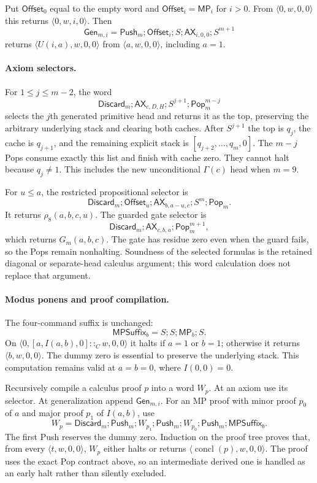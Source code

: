 Put $\mathsf{Offset}_0$ equal to the empty word and
$\mathsf{Offset}_i=\mathsf{MP}_i$ for $i>0$. From
$\langle0,w,0,0\rangle$ this returns $\langle0,w,i,0\rangle$.
Then
\[
 \mathsf{Gen}_{m,i}=\mathsf{Push}_m;\mathsf{Offset}_i;S;
                    \mathsf{AX}_{i,0,0};S^{m+1}
\]
returns $\langle U(i,a),w,0,0\rangle$ from
$\langle a,w,0,0\rangle$, including $a=1$.

\paragraph{Axiom selectors.}
For $1\le j\le m-2$, the word
\[
 \mathsf{Discard}_m;\mathsf{AX}_{c,D,H};S^{j+1};
      \mathsf{Pop}_m^{m-j}
\]
selects the $j$th generated primitive head and returns it as the top,
preserving the arbitrary underlying stack and clearing both caches.
After $S^{j+1}$ the top is $q_j$, the cache is $q_{j+1}$, and the remaining
explicit stack is $[q_{j+2},\ldots,q_m,0]$. The $m-j$ Pops consume exactly
this list and finish with cache zero. They cannot halt because $q_j\ne1$.
This includes the new unconditional $\Gamma(c)$ head when $m=9$.

For $u\le a$, the restricted propositional selector is
\[
 \mathsf{Discard}_m;\mathsf{Offset}_u;
 \mathsf{AX}_{b,a-u,c};S^m;\mathsf{Pop}_m.
\]
It returns $\rho_8(a,b,c,u)$. The guarded gate selector is
\[
 \mathsf{Discard}_m;\mathsf{AX}_{c,b,a};\mathsf{Pop}_m^{m+1},
\]
which returns $G_m(a,b,c)$. The gate has residue zero even when the guard
fails, so the Pops remain nonhalting. Soundness of the selected formulas
is the retained diagonal or separate-head calculus argument; this word
calculation does not replace that argument.

\paragraph{Modus ponens and proof compilation.}
The four-command suffix is unchanged:
\[
 \mathsf{MPSuffix}_b=S;S;\mathsf{MP}_b;S.
\]
On $\langle0,[a,I(a,b),0]::_Cw,0,0\rangle$ it halts if $a=1$ or $b=1$;
otherwise it returns $\langle b,w,0,0\rangle$. The dummy zero is essential
to preserve the underlying stack. This computation remains valid at
$a=b=0$, where $I(0,0)=0$.

Recursively compile a calculus proof $p$ into a word $W_p$. At an axiom
use its selector. At generalization append $\mathsf{Gen}_{m,i}$. For an
MP proof with minor proof $p_0$ of $a$ and major proof $p_1$ of $I(a,b)$,
use
\[
 W_p=\mathsf{Discard}_m;\mathsf{Push}_m;
      W_{p_1};\mathsf{Push}_m;W_{p_0};\mathsf{Push}_m;
      \mathsf{MPSuffix}_b.
\]
The first Push reserves the dummy zero. Induction on the proof tree proves
that, from every $\langle t,w,0,0\rangle$, $W_p$ either halts or returns
$\langle\operatorname{concl}(p),w,0,0\rangle$. The proof uses the exact
Pop contract above, so an intermediate derived one is handled as an early
halt rather than silently excluded.

